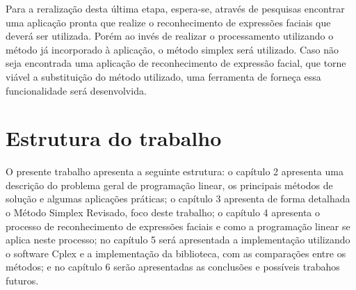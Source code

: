 Para a reralização desta última etapa, espera-se, através de pesquisas encontrar uma aplicação pronta que realize o reconhecimento de expressões faciais que deverá ser utilizada. Porém ao invés de realizar o processamento utilizando o método já incorporado à aplicação, o método simplex será utilizado. Caso não seja encontrada uma aplicação de reconhecimento de expressão facial, que torne viável a substituição do método utilizado, uma ferramenta de forneça essa funcionalidade será desenvolvida.

\section{Estrutura do trabalho}
O presente trabalho apresenta a seguinte estrutura: o capítulo 2 apresenta uma descrição do problema geral de programação linear, os principais métodos de solução e algumas aplicações práticas; o capítulo 3 apresenta de forma detalhada o Método Simplex Revisado, foco deste trabalho; o capítulo 4 apresenta o processo de reconhecimento de expressões faciais e como a programação linear se aplica neste processo; no capítulo 5 será apresentada a implementação utilizando o software Cplex e a implementação da biblioteca, com as comparações entre os métodos; e no capítulo 6 serão apresentadas as conclusões e possíveis trabahos futuros. 
